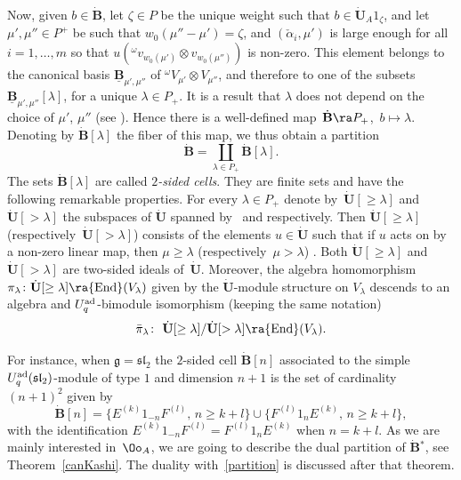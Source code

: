 Now, given $b\in \dot{\mathbf{B}}$, let $\zeta\in P$ be the unique weight such that $b \in \dot{\mathbf{U}}_A 1_\zeta$, and let ${\mu', \mu''\in P^+}$ be such that $w_0(\mu''-\mu')=\zeta$, and $(\check{\alpha}_i,\mu')$ is large enough for all $i=1,\dots,m$ so that $u({}^\omega v_{w_0(\mu')}\otimes v_{w_0(\mu'')})$ is non-zero. This element belongs to the canonical basis $\underline{\mathbf{B}}_{\mu',\mu''}$ of ${}^{\omega}V_{\mu'}\otimes V_{\mu''}$, and therefore to one of the subsets $\underline{\mathbf{B}}_{\mu',\mu''}[\lambda]$, for a unique $\lambda\in P_+$. It is a result that $\lambda$ does not depend on the choice of $\mu'$, $\mu''$ (see \cite[Section~29.1.1]{Lusztig}). Hence there is a well-defined map~${\dot{\mathbf{B}}\ra P_+}$,~$b\mapsto \lambda$. Denoting by $\dot{\mathbf{B}} [\lambda]$ the fiber of this map, we thus obtain a partition
\begin{equation}\label{partition} \dot{\mathbf{B}} = \coprod_{\lambda\in P_+}\dot{\mathbf{B}} [\lambda]. \end{equation}
The sets $\dot{\mathbf{B}} [\lambda]$ are called {\it $2$-sided cells}. They are finite sets and have the following remarkable properties. For every $\lambda\in P_+$ denote by~${\dot{\mathbf{U}} [\geq \lambda]}$ and $\dot{\mathbf{U}} [> \lambda]$ the subspaces of $\dot{\mathbf{U}}$ spanned by~ and  respectively. Then $\dot{\mathbf{U}} [\geq \lambda]$ (respectively~${\dot{\mathbf{U}} [> \lambda]}$) consists of the elements $u\in \dot{\mathbf{U}}$ such that if $u$ acts on  by a non-zero linear map, then $\mu\geq \lambda$ (respectively~${\mu> \lambda}$) \cite[Lemmas~29.1.3 and~29.1.4]{Lusztig}. Both $\dot{\mathbf{U}} [\geq \lambda]$ and $\dot{\mathbf{U}} [> \lambda]$ are two-sided ideals of~$\dot{\mathbf{U}}$. Moreover, the algebra homomorphism $\pi_\lambda\colon \dot{\mathbf{U}} [\geq\lambda] \ra {\rm End}(V_\lambda)$ given by the $\dot{\mathbf{U}}$-module structure on $V_\lambda$ descends to an algebra and $U_q^{\rm ad}$-bimodule isomorphism (keeping the same notation) \cite[Proposition~29.2.2]{Lusztig}
\begin{equation}\label{pimuiso} \bar{\pi}_\lambda\colon\ \dot{\mathbf{U}} [\geq \lambda]/ \dot{\mathbf{U}} [> \lambda] \ra {\rm End}(V_\lambda) . \end{equation}

For instance, when $\mathfrak{g}={\mathfrak{sl}_2}$ the $2$-sided cell $\dot{\mathbf{B}} [n]$ associated to the simple $U_q^{\rm ad}({\mathfrak{sl}_2})$-module of type $1$ and dimension $n+1$ is the set of cardinality $(n+1)^2$ given by \cite[Section~29.4.3]{Lusztig}
\begin{equation}\label{2sidedcellsl2}
\dot{\mathbf{B}} [n] =\big\{E^{(k)}1_{-n}F^{(l)},\,n\geq k+l \big\} \cup \big\{F^{(l)}1_nE^{(k)},\,n\geq k+l\big\},
\end{equation}
with the identification $E^{(k)}1_{-n}F^{(l)} = F^{(l)}1_nE^{(k)}$ when $n=k+l$. As we are mainly interested in~$\Oo_A$, we are going to describe the dual partition of $\dot{\mathbf{B}} {}^*$, see Theorem~\ref{canKashi}. The duality with~\eqref{partition} is discussed after that theorem.

